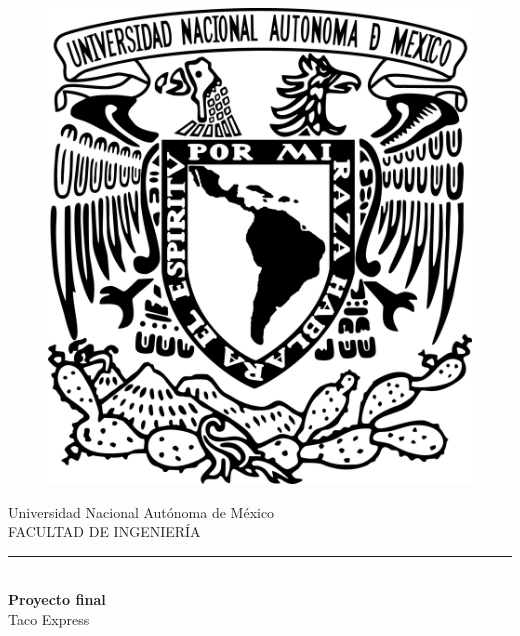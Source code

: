 \documentclass{article}
\begin{document}

\begin{center}
    \begin{figure}[H]
    \centering
    \includegraphics[scale=0.2]{unam-escudo.png}
    \end{figure}
    \large Universidad Nacional Autónoma de México    \\
    \Large FACULTAD DE INGENIERÍA\\
    \rule{15cm}{0.05cm}
    \vspace{2cm}\\
    \huge \textbf{Proyecto final}\\
    \vspace{0.3cm}
    \Large Taco Express\\
    \vspace{0.5cm}
\end{center}
    \vspace{1.5cm}
\end{document}
